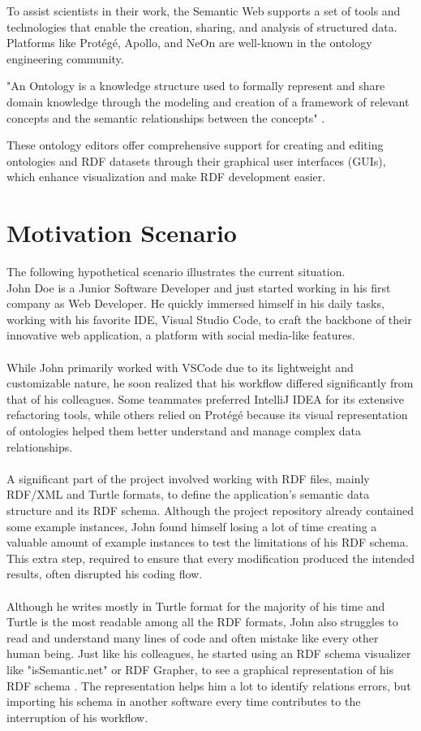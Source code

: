 To assist scientists in their work, the Semantic Web supports a set of tools and technologies that enable the creation, sharing, and analysis of structured data.
Platforms like Protégé, Apollo, and NeOn are well-known in the ontology engineering community. 

"An Ontology is a knowledge structure used to formally represent and share domain knowledge through the modeling and creation of a framework of relevant concepts and the semantic relationships between the concepts" \cite{ontology}.

These ontology editors offer comprehensive support for creating and editing ontologies and RDF datasets through their graphical user interfaces (GUIs), which enhance visualization and make RDF development easier.

\section{Motivation Scenario\label{sec:moti}}

The following hypothetical scenario illustrates the current situation.
\\
John Doe is a Junior Software Developer and just started working in his first company as Web Developer.
He quickly immersed himself in his daily tasks, working with his favorite IDE, Visual Studio Code, to craft the backbone of their innovative web application, a platform with social media-like features. 
\\
\\
While John primarily worked with VSCode due to its lightweight and customizable nature, he soon realized that his workflow differed significantly from that of his colleagues. Some teammates preferred IntelliJ IDEA for its extensive refactoring tools, while others relied on Protégé because its visual representation of ontologies helped them better understand and manage complex data relationships.
\\
\\
A significant part of the project involved working with RDF files, mainly RDF/XML and Turtle formats, to define the application's semantic data structure and its RDF schema. Although the project repository already contained some example instances, John found himself losing a lot of time creating a valuable amount of example instances to test the limitations of his RDF schema. This extra step, required to ensure that every modification produced the intended results, often disrupted his coding flow.
\\
\\
Although he writes mostly in Turtle format for the majority of his time and Turtle is the most readable among all the RDF formats, John also struggles to read and understand many lines of code and often mistake like every other human being. Just like his colleagues, he started using an RDF schema visualizer like "isSemantic.net" or RDF Grapher, to see a graphical representation of his RDF schema \cite{issemantic,rdfGrapher}. The representation helps him a lot to identify relations errors, but importing his schema in another software every time contributes to the interruption of his workflow.


